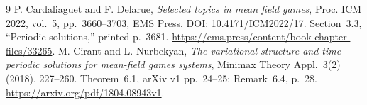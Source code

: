 \documentclass[11pt,a4paper]{article}
\begin{document}
\begin{thebibliography}{9}
 P. Cardaliaguet and F. Delarue,
\emph{Selected topics in mean field games}, Proc. ICM 2022, vol.~5,
pp.~3660--3703, EMS Press. DOI:
\href{https://doi.org/10.4171/ICM2022/17}{10.4171/ICM2022/17}.
Section~3.3, ``Periodic solutions,'' printed p.~3681.
\url{https://ems.press/content/book-chapter-files/33265}.
 M. Cirant and L. Nurbekyan,
\emph{The variational structure and time-periodic solutions for
mean-field games systems}, Minimax Theory Appl.~3(2) (2018), 227--260.
Theorem~6.1, arXiv v1 pp.~24--25; Remark~6.4, p.~28.
\url{https://arxiv.org/pdf/1804.08943v1}.
\end{thebibliography}
\end{document}
